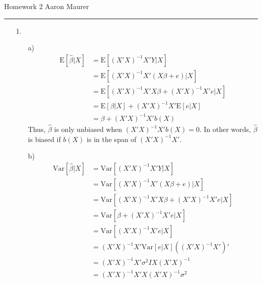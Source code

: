 \documentclass[11pt]{article}
\newcommand{\E}{\mathrm{E}}
\newcommand{\var}{\mathrm{Var}}
\theoremstyle{definition}
\begin{document}

Homework 2 \hfill Aaron Maurer
\vspace{2mm}
\hrule
\vspace{2mm}
\begin{itemize}
    \item[1.]
        \begin{itemize}
            \item[a)]
                \begin{align*}
                    \E[\hat{\beta} \vert X] &= \E[(X'X)^{-1}X'Y \vert X] \\
                                            &= \E[(X'X)^{-1}X'(X\beta+e) \vert X] \\
                                            &= \E[(X'X)^{-1}X'X\beta+(X'X)^{-1}X'e \vert X] \\
                                            &= \E[\beta \vert X] + (X'X)^{-1}X' \E[e \vert X] \\
                                            &= \beta + (X'X)^{-1}X' b(X)
                \end{align*}
                Thus, $\hat{\beta}$ is only unbiased when \((X'X)^{-1}X' b(X) = 0\).
                In other words, $\hat{\beta}$ is biased if  $b(X)$ is in the span of \((X'X)^{-1}X'\).
            \item[b)]
                \begin{align*}
                    \var[\hat{\beta} \vert X ] &= \var[(X'X)^{-1}X'Y \vert X ] \\
                                               &= \var[(X'X)^{-1}X'(X\beta+e) \vert X ] \\
                                               &= \var[(X'X)^{-1}X'X\beta+(X'X)^{-1}X'e \vert X] \\
                                               &= \var[\beta+(X'X)^{-1}X'e \vert X] \\
                                               &= \var[(X'X)^{-1}X'e \vert X] \\
                                               &= (X'X)^{-1}X'\var[e \vert X]((X'X)^{-1}X')' \\
                                               &= (X'X)^{-1}X'\sigma^2I X (X'X)^{-1} \\
                                               &= (X'X)^{-1}X'X(X'X)^{-1} \sigma^2 \\

\end{align*}
\end{itemize}
\end{itemize}
\end{document}
